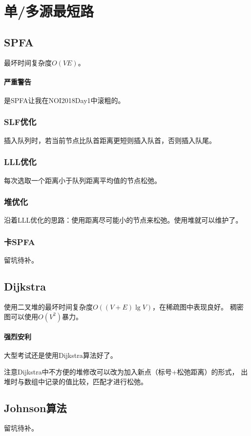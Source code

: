 \section{单/多源最短路}
\subsection{SPFA}
最坏时间复杂度$O(VE)$。
\paragraph{严重警告}
是SPFA让我在NOI2018Day1中滚粗的。
\subsubsection{SLF优化}
插入队列时，若当前节点比队首距离更短则插入队首，否则插入队尾。
\subsubsection{LLL优化}
每次选取一个距离小于队列距离平均值的节点松弛。
\subsubsection{堆优化}
沿着LLL优化的思路：使用距离尽可能小的节点来松弛。使用堆就可以维护了。
\subsubsection{卡SPFA}
留坑待补。
\subsection{Dijkstra}
使用二叉堆的最坏时间复杂度$O((V+E)\lg V)$，在稀疏图中表现良好。
稠密图可以使用$O(V^2)$暴力。
\paragraph{强烈安利}
大型考试还是使用Dijkstra算法好了。

注意Dijkstra中不方便的堆修改可以改为加入新点（标号+松弛距离）的形式，
出堆时与数组中记录的值比较，匹配才进行松弛。
\subsection{Johnson算法}
留坑待补。
